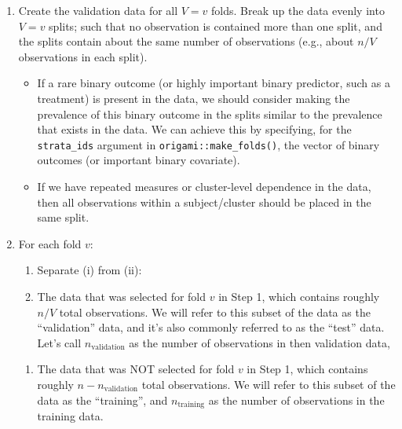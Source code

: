 \documentclass[12pt, krantz2,]{krantz}
\providecommand{\tightlist}{%
  \setlength{\itemsep}{0pt}\setlength{\parskip}{0pt}}
\theoremstyle{definition}
\theoremstyle{definition}
\theoremstyle{definition}
\newcommand{\1}{\mathbbm{1}}
\begin{document}
\begin{enumerate}
\def\labelenumi{\arabic{enumi}.}
\item
  Create the validation data for all \(V=v\) folds. Break up the data evenly
  into \(V=v\) splits; such that no observation is contained more than one split,
  and the splits contain about the same number of observations (e.g., about
  \(n/V\) observations in each split).

  \begin{itemize}
  \tightlist
  \item
    If a rare binary outcome (or highly important binary predictor, such as
    a treatment) is present in the data, we should consider making the
    prevalence of this binary outcome in the splits similar to the
    prevalence that exists in the data. We can achieve this by specifying,
    for the \texttt{strata\_ids} argument in \texttt{origami::make\_folds()}, the vector of
    binary outcomes (or important binary covariate).
  \item
    If we have repeated measures or cluster-level dependence in the data,
    then all observations within a subject/cluster should be placed in the
    same split.
  \end{itemize}
\item
  For each fold \(v\):

  \begin{enumerate}
  \def\labelenumii{\alph{enumii}.}
  \item
    Separate (i) from (ii):
  \item
    The data that was selected for fold \(v\) in Step 1, which contains
    roughly \(n/V\) total observations. We will refer to this subset of the
    data as the ``validation'' data, and it's also commonly referred to as
    the ``test'' data. Let's call \(n_{\text{validation}}\) as the number of
    observations in then validation data,
  \end{enumerate}

  \begin{enumerate}
  \def\labelenumii{\roman{enumii}.}
  \setcounter{enumii}{1}
  \tightlist
  \item
    The data that was NOT selected for fold \(v\) in Step 1, which contains
    roughly \(n - n_{\text{validation}}\) total observations. We will refer
    to this subset of the data as the ``training'', and
    \(n_{\text{training}}\) as the number of observations in the training
    data.
  \end{enumerate}


\end{enumerate}
\end{document}
